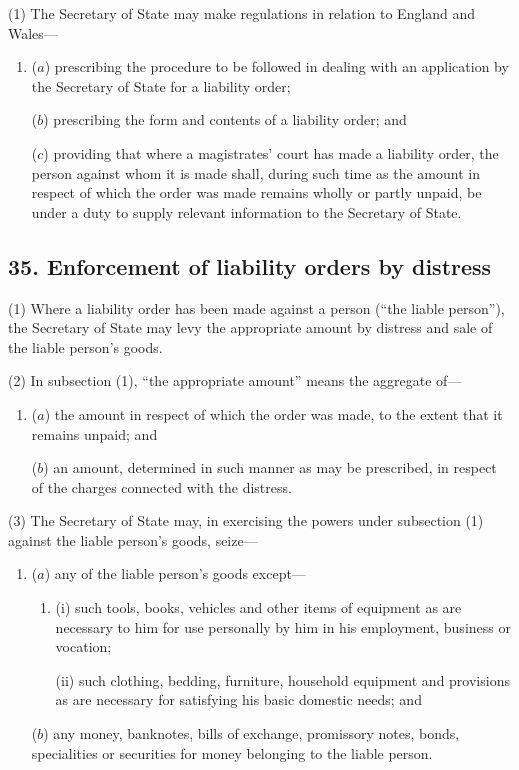 \documentclass[a4paper]{article}
\begin{document}
(1) The Secretary of State may make regulations in relation to England and Wales---
\begin{enumerate}\item[]
($a$)
prescribing the procedure to be followed in dealing with an application by the Secretary of State for a liability order;

($b$)
prescribing the form and contents of a liability order; and

($c$)
providing that where a magistrates’ court has made a liability order, the person against whom it is made shall, during such time as the amount in respect of which the order was made remains wholly or partly unpaid, be under a duty to supply relevant information to the Secretary of State.
\end{enumerate}


\subsection{35. Enforcement of liability orders by distress}

(1) Where a liability order has been made against a person (“the liable person”), the Secretary of State may levy the appropriate amount by distress and sale of the liable person’s goods.

(2) In subsection (1), “the appropriate amount” means the aggregate of---
\begin{enumerate}\item[]
($a$)
the amount in respect of which the order was made, to the extent that it remains unpaid; and

($b$)
an amount, determined in such manner as may be prescribed, in respect of the charges connected with the distress.
\end{enumerate}

(3) The Secretary of State may, in exercising the powers under subsection (1) against the liable person’s goods, seize---
\begin{enumerate}\item[]
($a$)
any of the liable person’s goods except---
\begin{enumerate}\item[]
(i) such tools, books, vehicles and other items of equipment as are necessary to him for use personally by him in his employment, business or vocation;

(ii) such clothing, bedding, furniture, household equipment and provisions as are necessary for satisfying his basic domestic needs; and
\end{enumerate}
($b$)
any money, banknotes, bills of exchange, promissory notes, bonds, specialities or securities for money belonging to the liable person.
\end{enumerate}
\end{document}
